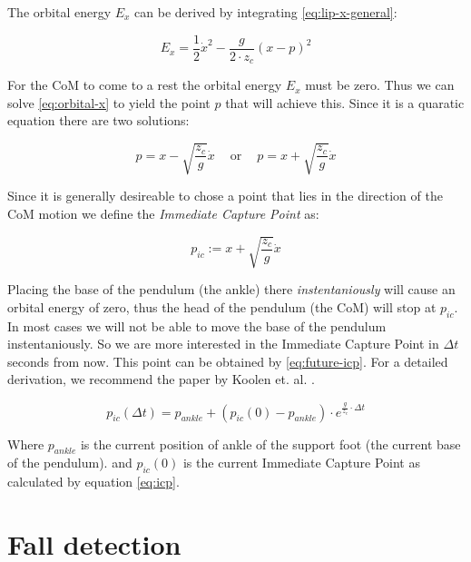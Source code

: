 \documentclass[english,ngerman]{KITreprt}
\begin{document}
The orbital energy $E_x$ can be derived by integrating
\ref{eq:lip-x-general}:

\begin{equation} \label{eq:orbital-x}
E_x = \frac{1}{2} \dot{x}^2 - \frac{g}{2 \cdot z_c} (x - p)^2
\end{equation}

For the CoM to come to a rest the orbital energy $E_x$ must be zero.
Thus we can solve \ref{eq:orbital-x} to yield the point $p$ that will
achieve this. Since it is a quaratic equation there are two solutions:

\begin{equation}
p = x - \sqrt{\frac{z_c}{g}} \dot{x} \:\:\:\:\text{ or }\:\:\:\: p = x + \sqrt{\frac{z_c}{g}} \dot{x}
\end{equation}

Since it is generally desireable to chose a point that lies in the
direction of the CoM motion we define the \emph{Immediate Capture Point}
as:

\begin{equation} \label{eq:icp}
p_{ic} := x + \sqrt{\frac{z_c}{g}} \dot{x}
\end{equation}

Placing the base of the pendulum (the ankle) there
\emph{instentaniously} will cause an orbital energy of zero, thus the
head of the pendulum (the CoM) will stop at $p_{ic}$. In most cases we
will not be able to move the base of the pendulum instentaniously. So we
are more interested in the Immediate Capture Point in $\Delta t$ seconds
from now. This point can be obtained by \ref{eq:future-icp}. For a
detailed derivation, we recommend the paper by Koolen et. al.
\cite{koolen2012capturability}.

\begin{equation} \label{eq:future-icp}
p_{ic}(\Delta t) = p_{ankle} + (p_{ic}(0) - p_{ankle}) \cdot e^{\frac{g}{z_c} \cdot \Delta t}
\end{equation}

Where $p_{ankle}$ is the current position of ankle of the support foot
(the current base of the pendulum). and $p_{ic}(0)$ is the current
Immediate Capture Point as calculated by equation \ref{eq:icp}.

\section{Fall detection}\label{fall-detection}
\end{document}
